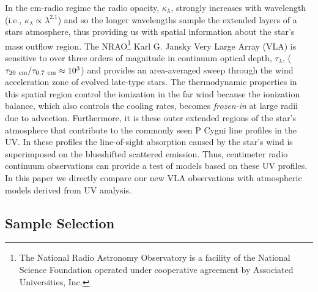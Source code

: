 \documentclass[iop]{emulateapj}
\begin{document}
In the cm-radio regime the radio opacity, $ \kappa _{\lambda}$, strongly increases with wavelength (i.e., $ \kappa _{\lambda} \propto \lambda ^{2.1}$) and so the longer wavelengths sample the extended layers of a stars atmosphere, thus	 providing us with spatial information about the star's mass outflow region. The NRAO\footnote{The National Radio Astronomy Observatory is a facility of the National Science Foundation operated under cooperative agreement by Associated Universities, Inc.} Karl G. Jansky Very Large Array (VLA) is sensitive to over three orders of magnitude in continuum optical depth, $\tau _{\lambda}$, ($\tau _{20 \ \rm{cm}}/\tau _{0.7 \ \rm{cm}} \approx 10^3$) and provides an area-averaged sweep through the wind acceleration zone of evolved late-type stars. The thermodynamic properties in this spatial region control the ionization in the far wind because the ionization balance, which also controls the cooling rates, becomes \textit{frozen-in} at large radii due to advection. Furthermore, it is these outer extended regions of the star's atmosphere that contribute to the commonly seen P Cygni line profiles in the UV. In these profiles the line-of-sight absorption caused by the star's wind is superimposed on the blueshifted scattered emission. Thus, centimeter radio continuum observations can provide a test of models based on these UV profiles. In this paper we directly compare our new VLA observations with atmospheric models derived from UV analysis.

\subsection{Sample Selection} \label{intro2}
\end{document}
